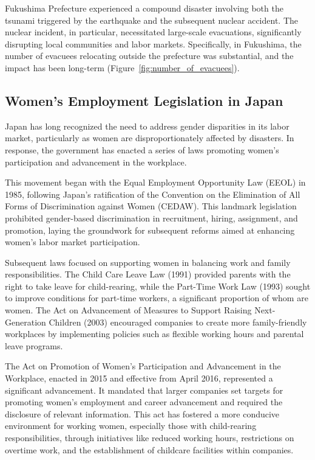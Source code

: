 \documentclass[a4paper,12pt]{article}
\begin{document}
\begin{flushleft}
\begin{table}[h!]
  \vspace{-1.6cm}
\end{table}
\end{flushleft}

Fukushima Prefecture experienced a compound disaster involving both the tsunami triggered by the earthquake and the subsequent nuclear accident. The nuclear incident, in particular, necessitated large-scale evacuations, significantly disrupting local communities and labor markets. Specifically, in Fukushima, the number of evacuees relocating outside the prefecture was substantial, and the impact has been long-term (Figure~\ref{fig:number_of_evacuees}).


\subsection{Women's Employment Legislation in Japan}

Japan has long recognized the need to address gender disparities in its labor market, particularly as women are disproportionately affected by disasters. In response, the government has enacted a series of laws promoting women's participation and advancement in the workplace.

This movement began with the Equal Employment Opportunity Law (EEOL) in 1985, following Japan's ratification of the Convention on the Elimination of All Forms of Discrimination against Women (CEDAW). This landmark legislation prohibited gender-based discrimination in recruitment, hiring, assignment, and promotion, laying the groundwork for subsequent reforms aimed at enhancing women's labor market participation.

Subsequent laws focused on supporting women in balancing work and family responsibilities. The Child Care Leave Law (1991) provided parents with the right to take leave for child-rearing, while the Part-Time Work Law (1993) sought to improve conditions for part-time workers, a significant proportion of whom are women. The Act on Advancement of Measures to Support Raising Next-Generation Children (2003) encouraged companies to create more family-friendly workplaces by implementing policies such as flexible working hours and parental leave programs.

The Act on Promotion of Women's Participation and Advancement in the Workplace, enacted in 2015 and effective from April 2016, represented a significant advancement. It mandated that larger companies set targets for promoting women's employment and career advancement and required the disclosure of relevant information. This act has fostered a more conducive environment for working women, especially those with child-rearing responsibilities, through initiatives like reduced working hours, restrictions on overtime work, and the establishment of childcare facilities within companies.
\end{document}
